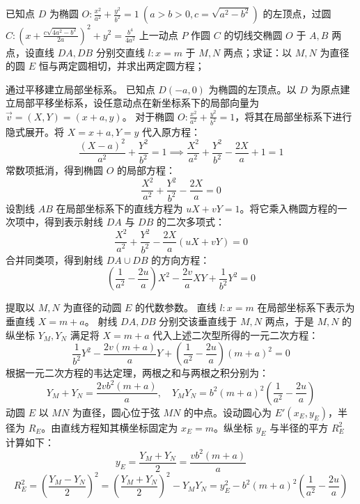 \begin{exercise}
已知点 \(D\) 为椭圆 \(O: \frac{x^2}{a^2} + \frac{y^2}{b^2} = 1\ (a > b > 0, c = \sqrt{a^2 - b^2})\) 的左顶点，过圆 \(C: \left(x + \frac{c\sqrt{4a^2 - b^2}}{2a}\right)^2 + y^2 = \frac{b^4}{4a^2}\) 上一动点 \(P\) 作圆 \(C\) 的切线交椭圆 \(O\) 于 \(A,B\) 两点，设直线 \(DA, DB\) 分别交直线 \(l: x = m\) 于 \(M,N\) 两点；求证：以 \(M,N\) 为直径的圆 \(E\) 恒与两定圆相切，并求出两定圆方程；
\end{exercise}
\begin{solution}
通过平移建立局部坐标系。
已知点 $D(-a, 0)$ 为椭圆的左顶点。以 $D$ 为原点建立局部平移坐标系，设任意动点在新坐标系下的局部向量为 $\vec{v} = (X, Y) = (x+a, y)$。
对于椭圆 $O: \frac{x^2}{a^2} + \frac{y^2}{b^2} = 1$，将其在局部坐标系下进行隐式展开。将 $X=x+a, Y=y$ 代入原方程：
$$ \frac{(X-a)^2}{a^2} + \frac{Y^2}{b^2} = 1 \implies \frac{X^2}{a^2} + \frac{Y^2}{b^2} - \frac{2X}{a} + 1 = 1 $$
常数项抵消，得到椭圆 $O$ 的局部方程：
$$ \frac{X^2}{a^2} + \frac{Y^2}{b^2} - \frac{2X}{a} = 0 $$
设割线 $AB$ 在局部坐标系下的直线方程为 $uX + vY = 1$。将它乘入椭圆方程的一次项中，得到表示射线 $DA$ 与 $DB$ 的二次多项式：
$$ \frac{X^2}{a^2} + \frac{Y^2}{b^2} - \frac{2X}{a}(uX + vY) = 0 $$
合并同类项，得到射线 $DA \cup DB$ 的方向方程：
$$ \left(\frac{1}{a^2} - \frac{2u}{a}\right)X^2 - \frac{2v}{a}XY + \frac{1}{b^2}Y^2 = 0 $$

提取以 $M, N$ 为直径的动圆 $E$ 的代数参数。
直线 $l: x = m$ 在局部坐标系下表示为垂直线 $X = m + a$。
射线 $DA, DB$ 分别交该垂直线于 $M, N$ 两点，于是 $M, N$ 的纵坐标 $Y_M, Y_N$ 满足将 $X = m+a$ 代入上述二次型所得的一元二次方程：
$$ \frac{1}{b^2}Y^2 - \frac{2v(m+a)}{a}Y + \left(\frac{1}{a^2} - \frac{2u}{a}\right)(m+a)^2 = 0 $$
根据一元二次方程的韦达定理，两根之和与两根之积分别为：
$$ Y_M + Y_N = \frac{2vb^2(m+a)}{a}, \quad Y_M Y_N = b^2(m+a)^2\left(\frac{1}{a^2} - \frac{2u}{a}\right) $$
动圆 $E$ 以 $MN$ 为直径，圆心位于弦 $MN$ 的中点。设动圆心为 $E'(x_E, y_E)$，半径为 $R_E$。由直线方程知其横坐标固定为 $x_E = m$。纵坐标 $y_E$ 与半径的平方 $R_E^2$ 计算如下：
$$ y_E = \frac{Y_M + Y_N}{2} = \frac{vb^2(m+a)}{a} $$
$$ R_E^2 = \left(\frac{Y_M - Y_N}{2}\right)^2 = \left(\frac{Y_M + Y_N}{2}\right)^2 - Y_M Y_N = y_E^2 - b^2(m+a)^2\left(\frac{1}{a^2} - \frac{2u}{a}\right) $$


\end{solution}
